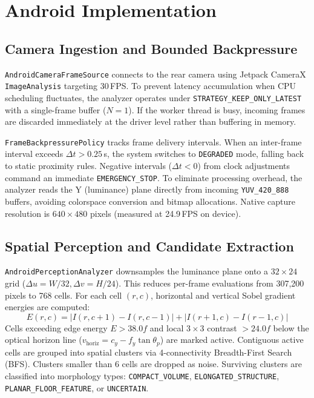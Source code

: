 \section{Android Implementation}
\label{sec:implementation}

\subsection{Camera Ingestion and Bounded Backpressure}
\label{sec:impl_camera}
\texttt{AndroidCameraFrameSource} connects to the rear camera using Jetpack CameraX \texttt{ImageAnalysis} targeting 30\,FPS. To prevent latency accumulation when CPU scheduling fluctuates, the analyzer operates under \texttt{STRATEGY\_KEEP\_ONLY\_LATEST} with a single-frame buffer ($N=1$). If the worker thread is busy, incoming frames are discarded immediately at the driver level rather than buffering in memory.

\texttt{FrameBackpressurePolicy} tracks frame delivery intervals. When an inter-frame interval exceeds $\Delta t > 0.25$\,s, the system switches to \texttt{DEGRADED} mode, falling back to static proximity rules. Negative intervals ($\Delta t < 0$) from clock adjustments command an immediate \texttt{EMERGENCY\_STOP}. To eliminate processing overhead, the analyzer reads the Y (luminance) plane directly from incoming \texttt{YUV\_420\_888} buffers, avoiding colorspace conversion and bitmap allocations. Native capture resolution is $640 \times 480$ pixels (measured at 24.9\,FPS on device).

\subsection{Spatial Perception and Candidate Extraction}
\label{sec:impl_perception}
\texttt{AndroidPerceptionAnalyzer} downsamples the luminance plane onto a $32 \times 24$ grid ($\Delta u = W/32, \Delta v = H/24$). This reduces per-frame evaluations from 307,200 pixels to 768 cells. For each cell $(r, c)$, horizontal and vertical Sobel gradient energies are computed:
\begin{equation}
E(r, c) = |I(r, c+1) - I(r, c-1)| + |I(r+1, c) - I(r-1, c)|
\label{eq:sobel_energy}
\end{equation}
Cells exceeding edge energy $E > 38.0f$ and local $3 \times 3$ contrast $> 24.0f$ below the optical horizon line ($v_{\text{horiz}} = c_y - f_y \tan\theta_p$) are marked active. Contiguous active cells are grouped into spatial clusters via 4-connectivity Breadth-First Search (BFS). Clusters smaller than 6 cells are dropped as noise. Surviving clusters are classified into morphology types: \texttt{COMPACT\_VOLUME}, \texttt{ELONGATED\_STRUCTURE}, \texttt{PLANAR\_FLOOR\_FEATURE}, or \texttt{UNCERTAIN}.

